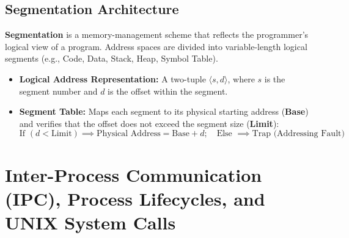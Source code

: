 \subsection{Segmentation Architecture}
\textbf{Segmentation} is a memory-management scheme that reflects the programmer's logical view of a program. Address spaces are divided into variable-length logical segments (e.g., Code, Data, Stack, Heap, Symbol Table).
\begin{itemize}
    \item \textbf{Logical Address Representation:} A two-tuple $\langle s, d \rangle$, where $s$ is the segment number and $d$ is the offset within the segment.
    \item \textbf{Segment Table:} Maps each segment to its physical starting address (\textbf{Base}) and verifies that the offset does not exceed the segment size (\textbf{Limit}):
    \begin{equation}
    \text{If } (d < \text{Limit}) \implies \text{Physical Address} = \text{Base} + d; \quad \text{Else } \implies \text{Trap (Addressing Fault)}
    \end{equation}
\end{itemize}

\section{Inter-Process Communication (IPC), Process Lifecycles, and UNIX System Calls}
\label{sec:os_ipc_lifecycle}

